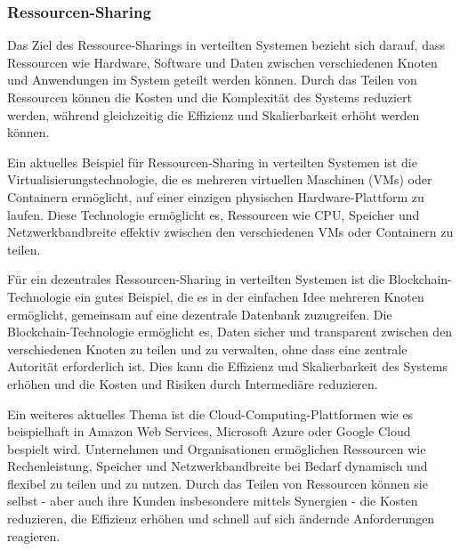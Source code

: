 
\subsubsection{Ressourcen-Sharing}
Das Ziel des Ressource-Sharings in verteilten Systemen bezieht sich darauf, dass Ressourcen wie Hardware, Software und Daten zwischen verschiedenen Knoten und Anwendungen im System geteilt werden können. Durch das Teilen von Ressourcen können die Kosten und die Komplexität des Systems reduziert werden, während gleichzeitig die Effizienz und Skalierbarkeit erhöht werden können.

Ein aktuelles Beispiel für Ressourcen-Sharing in verteilten Systemen ist die Virtualisierungstechnologie, die es mehreren virtuellen Maschinen (VMs) oder Containern ermöglicht, auf einer einzigen physischen Hardware-Plattform zu laufen. Diese Technologie ermöglicht es, Ressourcen wie CPU, Speicher und Netzwerkbandbreite effektiv zwischen den verschiedenen VMs oder Containern zu teilen.

Für ein dezentrales Ressourcen-Sharing in verteilten Systemen ist die Blockchain-Technologie ein gutes Beispiel, die es in der einfachen Idee mehreren Knoten ermöglicht, gemeinsam auf eine dezentrale Datenbank zuzugreifen. Die Blockchain-Technologie ermöglicht es, Daten sicher und transparent zwischen den verschiedenen Knoten zu teilen und zu verwalten, ohne dass eine zentrale Autorität erforderlich ist. Dies kann die Effizienz und Skalierbarkeit des Systems erhöhen und die Kosten und Risiken durch Intermediäre reduzieren.

Ein weiteres aktuelles Thema ist die Cloud-Computing-Plattformen wie es beispielhaft in Amazon Web Services, Microsoft Azure oder Google Cloud bespielt wird. Unternehmen und Organisationen ermöglichen Ressourcen wie Rechenleistung, Speicher und Netzwerkbandbreite bei Bedarf dynamisch und flexibel zu teilen und zu nutzen. Durch das Teilen von Ressourcen können sie selbst - aber auch ihre Kunden insbesondere mittels Synergien - die Kosten reduzieren, die Effizienz erhöhen und schnell auf sich ändernde Anforderungen reagieren.

